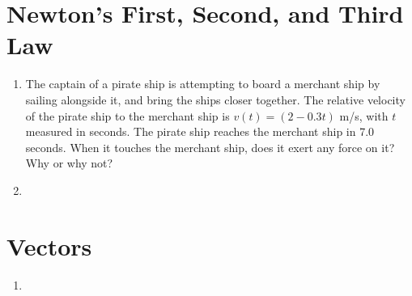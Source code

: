 \documentclass[10pt]{article}
\begin{document}
\section{Newton's First, Second, and Third Law}
\begin{enumerate}
\item The captain of a pirate ship is attempting to board a merchant ship by sailing alongside it, and bring the ships closer together.  The relative velocity of the pirate ship to the merchant ship is $v(t) = (2-0.3t)$ m/s, with $t$ measured in seconds.  The pirate ship reaches the merchant ship in 7.0 seconds.  When it touches the merchant ship, does it exert any force on it? Why or why not? \vspace{3cm}
\item \vspace{3cm}
\end{enumerate}
\section{Vectors}
\begin{enumerate}
\item 
\end{enumerate}
\end{document}
